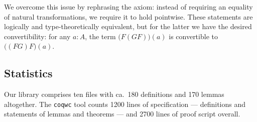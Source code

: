 We overcome this issue by rephrasing the axiom: instead of requiring an equality of natural 
transformations, we require it to hold pointwise. 
These statements are logically and type-theoretically equivalent, but for the latter we have the
desired convertibility: for any $a : A$, the term $\big(F(GF)\big)(a)$ is convertible to $\big((FG)F\big)(a)$.



\subsection*{Statistics}

Our library comprises ten files with ca.\ 180 definitions and 170 lemmas altogether.
The \texttt{coqwc} tool counts 1200 lines of specification --- definitions and statements of lemmas and theorems ---
and 2700 lines of proof script overall.




